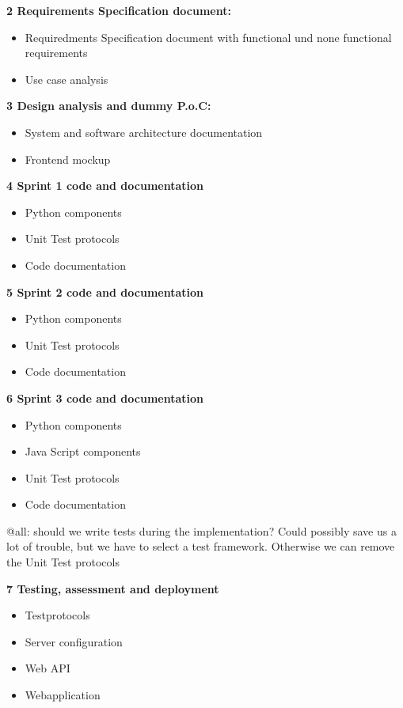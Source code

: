 \documentclass[notitlepage]{article}
\begin{document}
\begin{flushleft}
\textbf{2 Requirements Specification document:}
\\
\begin{itemize}
	\item Requiredments Specification document with functional und none functional requirements
	\item Use case analysis
\end{itemize}

\textbf{3 Design analysis and dummy P.o.C:}
\\
\begin{itemize}
	\item System and software architecture documentation
	\item Frontend mockup
\end{itemize}

\textbf{4 Sprint 1 code and documentation }
\\
\begin{itemize}
	\item Python components
	\item Unit Test protocols
	\item Code documentation
\end{itemize}

\textbf{5  Sprint 2 code and documentation }
\\
\begin{itemize}
	\item Python components
	\item Unit Test protocols
	\item Code documentation
\end{itemize}

\textbf{6 Sprint 3 code and documentation }
\\
\begin{itemize}
	\item Python components
	\item Java Script components
	\item Unit Test protocols
	\item Code documentation
\end{itemize}

{\color{red} @all: should we write tests during the implementation? Could possibly save us a lot of trouble, but we have to select a test framework.
Otherwise we can remove the Unit Test protocols}

\textbf{7 Testing, assessment and deployment}
\\
\begin{itemize}
	\item Testprotocols
	\item Server configuration
	\item Web API 
	\item Webapplication
\end{itemize}


\end{flushleft}
\end{document}
